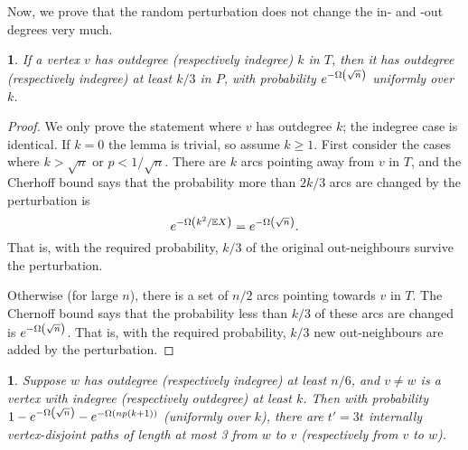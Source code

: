 \documentclass[11pt,english]{article}
\theoremstyle{plain}
\theoremstyle{definition}
\theoremstyle{definition}
\theoremstyle{plain}
\theoremstyle{plain}
\theoremstyle{plain}
\newtheorem{lem}[thm]{\protect\lemmaname}
\theoremstyle{plain}
\theoremstyle{remark}
\theoremstyle{remark}
\let\originalleft\left
\let\originalright\right
\renewcommand{\left}{\mathopen{}\mathclose\bgroup\originalleft}
\renewcommand{\right}{\aftergroup\egroup\originalright}
\providecommand{\lemmaname}{Lemma}
\begin{document}
Now, we prove that the random perturbation does not change the in-
and -out degrees very much.
\begin{lem}
\label{lem:preserve-degree}If a vertex $v$ has outdegree (respectively
indegree) $k$ in $T$, then it has outdegree (respectively indegree)
at least $k/3$ in $P$, with probability $e^{-\Omega\left(\sqrt{n}\right)}$
uniformly over $k$.\end{lem}
\begin{proof}
We only prove the statement where $v$ has outdegree $k$; the indegree
case is identical. If $k=0$ the lemma is trivial, so assume $k\ge1$.
First consider the cases where $k>\sqrt{n}$ or $p<1/\sqrt{n}$. There
are $k$ arcs pointing away from $v$ in $T$, and the Cherhoff bound
says that the probability more than $2k/3$ arcs are changed by the
perturbation is
\[
e^{-\Omega\left(k^{2}/\E X\right)}=e^{-\Omega\left(\sqrt{n}\right)}.
\]
That is, with the required probability, $k/3$ of the original out-neighbours
survive the perturbation.

Otherwise (for large $n$), there is a set of $n/2$ arcs pointing
towards $v$ in $T$. The Chernoff bound says that the probability less
than $k/3$ of these arcs are changed is $e^{-\Omega\left(\sqrt{n}\right)}$.
That is, with the required probability, $k/3$ new out-neighbours
are added by the perturbation.\end{proof}
\begin{lem}
\label{lem:path-from-home}Suppose $w$ has outdegree (respectively
indegree) at least $n/6$, and $v\ne w$ is a vertex with indegree
(respectively outdegree) at least $k$. Then with probability $1-e^{-\Omega\left(\sqrt{n}\right)}-e^{-\Omega\left(np\left(k+1\right)\right)}$
(uniformly over $k$), there are $t'=3t$ internally vertex-disjoint
paths of length at most 3 from $w$ to $v$ (respectively from $v$
to $w$).\end{lem}
\end{document}
